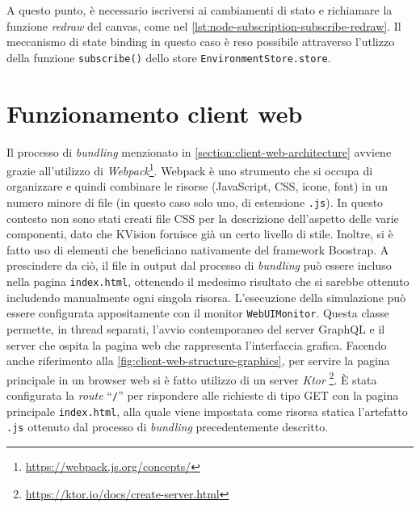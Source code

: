  A questo punto, è necessario iscriversi ai cambiamenti di stato e richiamare la funzione \textit{redraw} del canvas, come nel \cref{lst:node-subscription-subscribe-redraw}. Il meccanismo di state binding in questo caso è reso possibile attraverso l'utlizzo della funzione \texttt{subscribe()} dello store \texttt{EnvironmentStore.store}.

\section{Funzionamento client web}
Il processo di \textit{bundling} menzionato in \cref{section:client-web-architecture} avviene grazie all'utilizzo di \textit{Webpack}\footnote{\url{https://webpack.js.org/concepts/}}. Webpack è uno strumento
che si occupa di organizzare e quindi combinare le risorse (JavaScript, CSS, icone, font) in un numero minore di file (in questo caso solo uno, di estensione \texttt{.js}). In questo contesto non sono stati creati file CSS per la descrizione dell'aspetto delle varie componenti, dato che KVision fornisce già un certo livello di stile. Inoltre, si è fatto uso di elementi che beneficiano nativamente del framework Boostrap. A prescindere da ciò, il file in output dal processo di \textit{bundling} può essere incluso nella pagina \texttt{index.html}, ottenendo il medesimo risultato che si sarebbe ottenuto includendo manualmente ogni singola risorsa.
L'esecuzione della simulazione può essere configurata appositamente con il monitor \texttt{WebUIMonitor}. Questa classe permette, in thread separati, l'avvio contemporaneo del server GraphQL e il server che ospita la pagina web che rappresenta l'interfaccia grafica.
Facendo anche riferimento alla \cref{fig:client-web-structure-graphics}, per servire la pagina principale in un browser web si è fatto utilizzo di un server \textit{Ktor} \footnote{\url{https://ktor.io/docs/create-server.html}}.
È stata configurata la \textit{route} ``\texttt{/}'' per rispondere alle richieste di tipo GET con la pagina principale \texttt{index.html}, alla quale viene impostata come risorsa statica l'artefatto \texttt{.js} ottenuto dal processo di \textit{bundling} precedentemente descritto.
